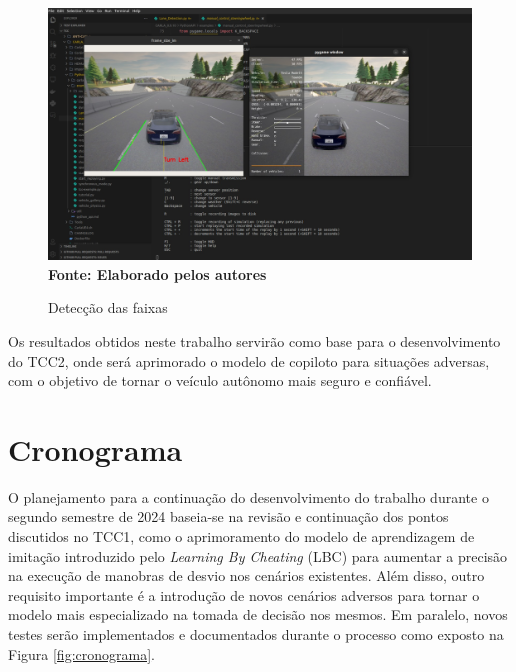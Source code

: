 \documentclass[a4paper,12pt,Times]{article}
\begin{document}
\begin{figure}[H]
    \centering
    \caption{Detecção das faixas}
    \includegraphics[scale=0.25]{figuras/Lane-detect.jpeg}\captionsetup{justification=centering}
  \vspace{-0.2cm}
     \\\textbf{\footnotesize Fonte: Elaborado pelos autores}
    \label{fig:lane-detect3}
\end{figure}

Os resultados obtidos neste trabalho servirão como base para o desenvolvimento do TCC2, onde será aprimorado o modelo de copiloto para situações adversas, com o objetivo de tornar o veículo autônomo mais seguro e confiável.


\section{Cronograma}

O planejamento para a continuação do desenvolvimento do trabalho durante o segundo semestre de 2024 baseia-se na revisão e continuação dos pontos discutidos no TCC1, como o aprimoramento do modelo de aprendizagem de imitação introduzido pelo \textit{Learning By Cheating} (LBC) para aumentar a precisão na execução de manobras de desvio nos cenários existentes. Além disso, outro requisito importante é a introdução de novos cenários adversos para tornar o modelo mais especializado na tomada de decisão nos mesmos. Em paralelo, novos testes serão implementados e documentados durante o processo como exposto na Figura \ref{fig:cronograma}.
\end{document}
